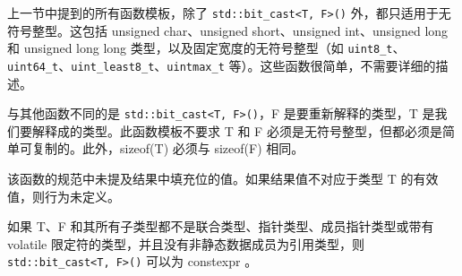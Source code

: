 
上一节中提到的所有函数模板，除了 \verb|std::bit_cast<T, F>()| 外，都只适用于无符号整型。这包括 unsigned char、unsigned short、unsigned int、unsigned long 和 unsigned long long 类型，以及固定宽度的无符号整型（如 \verb|uint8_t|、\verb|uint64_t|、\verb|uint_least8_t|、\verb|uintmax_t| 等）。这些函数很简单，不需要详细的描述。

与其他函数不同的是 \verb|std::bit_cast<T, F>()|，F 是要重新解释的类型，T 是我们要解释成的类型。此函数模板不要求 T 和 F 必须是无符号整型，但都必须是简单可复制的。此外，sizeof(T) 必须与 sizeof(F) 相同。

该函数的规范中未提及结果中填充位的值。如果结果值不对应于类型 T 的有效值，则行为未定义。

如果 T、F 和其所有子类型都不是联合类型、指针类型、成员指针类型或带有 volatile 限定符的类型，并且没有非静态数据成员为引用类型，则 \verb|std::bit_cast<T, F>()| 可以为 constexpr 。

